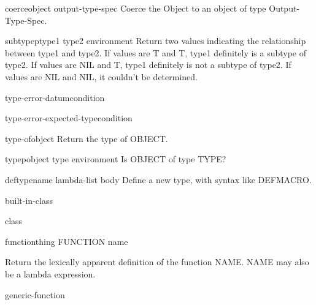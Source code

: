 \begin{function}{coerce}{object output-type-spec}{}{}
  Coerce the Object to an object of type Output-Type-Spec.
\end{function}

\begin{function}{subtypep}{type1 type2 \op environment}{}{}
  Return two values indicating the relationship between type1 and type2.
  If values are T and T, type1 definitely is a subtype of type2.
  If values are NIL and T, type1 definitely is not a subtype of type2.
  If values are NIL and NIL, it couldn't be determined.
\end{function}

\begin{function}{type-error-datum}{condition}{}{}
  
\end{function}

\begin{function}{type-error-expected-type}{condition}{}{}
  
\end{function}

\begin{function}{type-of}{object}{}{}
  Return the type of OBJECT.
\end{function}

\begin{function}{typep}{object type \op environment}{}{}
  Is OBJECT of type TYPE?
\end{function}

\begin{macro}{deftype}{name lambda-list \body body}{}{}
  Define a new type, with syntax like DEFMACRO.
\end{macro}

\begin{class}{built-in-class}{}{}{}
  
\end{class}

\begin{class}{class}{}{}{}
  
\end{class}

\begin{class}{function}{thing}{}{}
  FUNCTION name

Return the lexically apparent definition of the function NAME. NAME may also
be a lambda expression.
\end{class}

\begin{class}{generic-function}{}{}{}
  
\end{class}

